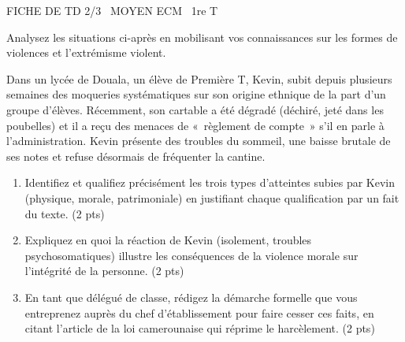 \documentclass[11pt]{article}
\begin{document}
\begin{tcolorbox}[enhanced,colback=popink,colframe=popink,arc=10pt,boxrule=0pt,left=12pt,right=12pt,top=9pt,bottom=9pt]
{\color{white}\popxbold\small FICHE DE TD 2/3 \textbullet\ MOYEN \hfill ECM \textbullet\ 1re T\par}
\end{tcolorbox}
\vspace{4pt}
Analysez les situations ci-après en mobilisant vos connaissances sur les formes de violences et l'extrémisme violent.

\begin{exercice}
Dans un lycée de Douala, un élève de Première T, Kevin, subit depuis plusieurs semaines des moqueries systématiques sur son origine ethnique de la part d'un groupe d'élèves. Récemment, son cartable a été dégradé (déchiré, jeté dans les poubelles) et il a reçu des menaces de «~règlement de compte~» s'il en parle à l'administration. Kevin présente des troubles du sommeil, une baisse brutale de ses notes et refuse désormais de fréquenter la cantine.
\begin{enumerate}
    \item Identifiez et qualifiez précisément les trois types d'atteintes subies par Kevin (physique, morale, patrimoniale) en justifiant chaque qualification par un fait du texte. (2 pts)
    \item Expliquez en quoi la réaction de Kevin (isolement, troubles psychosomatiques) illustre les conséquences de la violence morale sur l'intégrité de la personne. (2 pts)
    \item En tant que délégué de classe, rédigez la démarche formelle que vous entreprenez auprès du chef d'établissement pour faire cesser ces faits, en citant l'article de la loi camerounaise qui réprime le harcèlement. (2 pts)
\end{enumerate}
\end{exercice}
\end{document}
